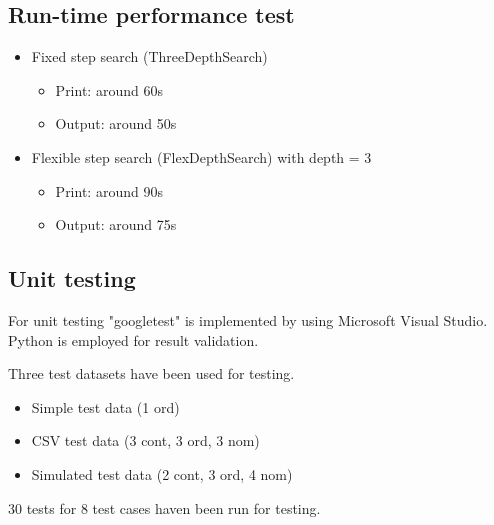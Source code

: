 \documentclass{article}
\begin{document}
\subsection{Run-time performance test}
\begin{itemize}
\item Fixed step search (ThreeDepthSearch)
\begin{itemize}
\item Print: around 60s
\item Output: around 50s 
\end{itemize}
\item Flexible step search (FlexDepthSearch) with depth  = 3
\begin{itemize}
\item Print: around 90s
\item Output: around 75s 
\end{itemize}
\end{itemize}


\subsection{Unit testing}
For unit testing "googletest" is implemented by using Microsoft Visual Studio. Python is employed for result validation.

Three test datasets have been used for testing.
\begin{itemize}
\item Simple test data (1 ord)
\item CSV test data (3 cont, 3 ord, 3 nom)
\item Simulated test data (2 cont, 3 ord, 4 nom)
\end{itemize}

30 tests for 8 test cases haven been run for testing.
\end{document}
